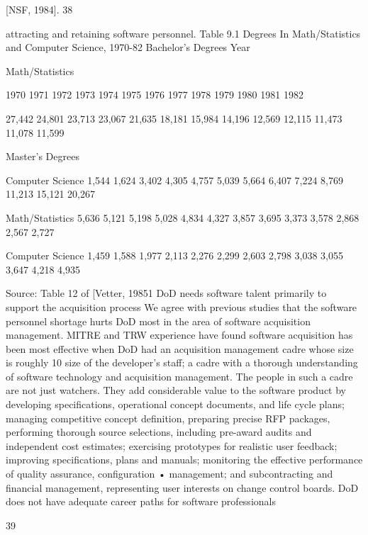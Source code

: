 \documentclass[12pt]{article}
\begin{document}
[NSF, 1984].
38

attracting and retaining software personnel.
Table 9.1
Degrees In Math/Statistics and Computer Science, 1970-82
Bachelor's Degrees
Year

Math/Statistics

1970
1971
1972
1973
1974
1975
1976
1977
1978
1979
1980
1981
1982

27,442
24,801
23,713
23,067
21,635
18,181
15,984
14,196
12,569
12,115
11,473
11,078
11,599

Master's Degrees

Computer Science
1,544
1,624
3,402
4,305
4,757
5,039
5,664
6,407
7,224
8,769
11,213
15,121
20,267

Math/Statistics
5,636
5,121
5,198
5,028
4,834
4,327
3,857
3,695
3,373
3,578
2,868
2,567
2,727

Computer Science
1,459
1,588
1,977
2,113
2,276
2,299
2,603
2,798
3,038
3,055
3,647
4,218
4,935

Source: Table 12 of [Vetter, 19851
DoD needs software talent primarily to support the acquisition process
We agree with previous studies that the software personnel shortage hurts DoD most
in the area of software acquisition management.
MITRE and TRW experience have found software acquisition has been most effective
when DoD had an acquisition management cadre whose size is roughly 10%
size of the developer's staff; a cadre with a thorough understanding of software technology
and acquisition management.
The people in such a cadre are not just watchers. They add considerable value to
the software product by developing specifications, operational concept documents, and life
cycle plans; managing competitive concept definition, preparing precise RFP packages,
performing thorough source selections, including pre-award audits and independent cost
estimates; exercising prototypes for realistic user feedback; improving specifications, plans
and manuals; monitoring the effective performance of quality assurance, configuration
• management; and subcontracting and financial management, representing user interests
on change control boards.
DoD does not have adequate career paths for software professionals

39
\end{document}

